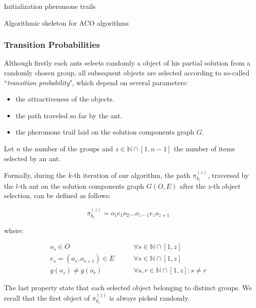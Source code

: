 \documentclass[12pt,a4paper]{report}
\newcommand{\N}{\mathbb{N}}
\newcommand{\SetFromOneTo}[1]{\N \cap \left[1,#1\right]}
\newcommand{\ItalicQuotMark}[1]{``\textit{#1}"}
\begin{document}
\begin{algorithm}\label{ACO}
	Initialization pheromone trails\;
	\caption{Algorithmic skeleton for ACO algorithms}
\end{algorithm}

\subsubsection{Transition Probabilities}

Although firstly each ants selects randomly a object of his partial solution from a randomly chosen group, all subsequent objects are selected according to so-called \ItalicQuotMark{transition probability}, which depend on several parameters:

\begin{itemize}
	\item the attractiveness of the objects.
	\item the path traveled so far by the ant.
	\item the pheromone trail laid on the solution components graph $G$.
\end{itemize}

Let $n$ the number of the groups and $z \in \SetFromOneTo{n-1}$ the number of items selected by an ant. 

Formally, during the $k$-th iteration of our algorithm, the path $\pi_{k_l}^{(z)}$, traversed by the $l$-th ant on the solution components graph $G(O,E)$ after the $z$-th object selection, can be defined as follows:

\begin{equation}
	\pi_{k_l}^{(z)} = o_1e_1o_2 \ldots o_{z-1}e_{z}o_{z+1}
\end{equation} 

where:

\begin{eqnarray}
	o_s \in O & \qquad \forall s \in \SetFromOneTo{z} \\
	e_s = (o_s,o_{s+1}) \in E  & \qquad \forall s \in \SetFromOneTo{z} \\
	g(o_s) \neq g(o_r)   &\qquad \forall s,r \in \SetFromOneTo{z} : s \neq r
\end{eqnarray}

The last property state that each selected object belonging to distinct groups. We recall that the first object of $\pi_{k_l}^{(z)}$ is always picked randomly.
\end{document}
